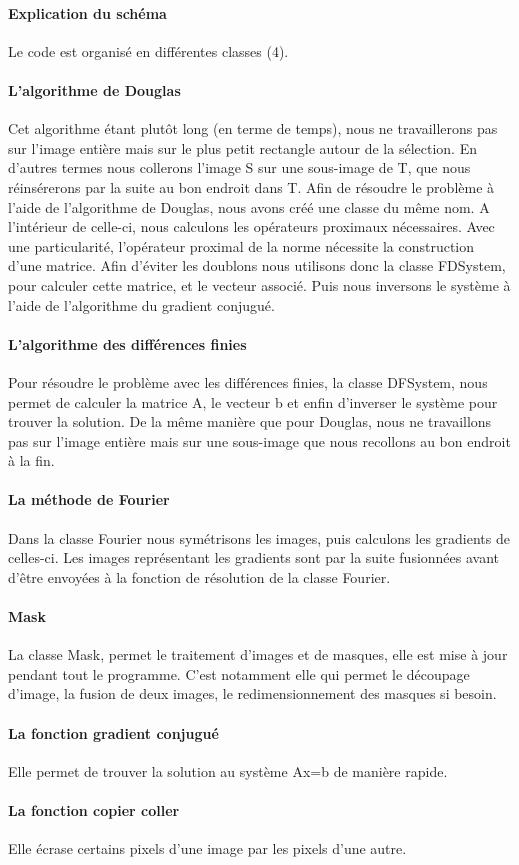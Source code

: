 \paragraph{Explication du schéma}
Le code est organisé en différentes classes (4).
\paragraph{L'algorithme de Douglas}
Cet algorithme étant plutôt long (en terme de temps), nous ne travaillerons pas sur l'image entière mais sur le plus petit rectangle autour de la sélection. En d'autres termes nous collerons l'image S sur une sous-image de T, que nous réinsérerons par la suite au bon endroit dans T. Afin de résoudre le problème à l'aide de l'algorithme de Douglas, nous avons créé une classe du même nom.  A l'intérieur de celle-ci, nous calculons les opérateurs proximaux nécessaires. Avec une particularité, l'opérateur proximal de la norme nécessite la construction d'une matrice. Afin d'éviter les doublons nous utilisons donc la classe FDSystem, pour calculer cette matrice, et le vecteur associé. Puis nous inversons le système à l'aide de l'algorithme du gradient conjugué. 
\paragraph{L'algorithme des différences finies}
Pour résoudre le problème avec les différences finies, la classe DFSystem, nous permet de calculer la matrice A, le vecteur b et enfin d'inverser le système pour trouver la solution. De la même manière que pour Douglas, nous ne travaillons pas sur l'image entière mais sur une sous-image que nous recollons au bon endroit à la fin.
\paragraph{La méthode de Fourier}
Dans la classe Fourier nous symétrisons les images, puis calculons les gradients de celles-ci. Les images représentant les gradients sont par la suite fusionnées avant d'être envoyées à la fonction de résolution de la classe Fourier. 
\paragraph{Mask}
La classe Mask, permet le traitement d'images et de masques, elle est mise à jour pendant tout le programme. C'est notamment elle qui permet le découpage d'image, la fusion de deux images, le redimensionnement des masques si besoin. 
\paragraph{La fonction gradient conjugué}
Elle permet de trouver la solution au système Ax=b de manière rapide.
\paragraph{La fonction copier coller} 
Elle écrase certains pixels d'une image par les pixels d'une autre.